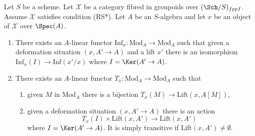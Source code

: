 \begin{lemma}
\label{lemma-properties-lift-RS-star}
Let $S$ be a scheme. Let $\mathcal{X}$ be a category
fibred in groupoids over $(\Sch/S)_{fppf}$. Assume $\mathcal{X}$ satisfies
condition (RS*). Let $A$ be an $S$-algebra and let $x$ be an object of
$\mathcal{X}$ over $\Spec(A)$.
\begin{enumerate}
\item There exists an $A$-linear functor
$\text{Inf}_x : \text{Mod}_A \to \text{Mod}_A$
such that given a deformation situation $(x, A' \to A)$ and a lift $x'$
there is an isomorphism $\text{Inf}_x(I) \to \text{Inf}(x'/x)$ where
$I = \Ker(A' \to A)$.
\item There exists an $A$-linear functor
$T_x : \text{Mod}_A \to \text{Mod}_A$
such that
\begin{enumerate}
\item given $M$ in $\text{Mod}_A$ there is a bijection
$T_x(M) \to \text{Lift}(x, A[M])$,
\item given a deformation situation $(x, A' \to A)$ there is an action
$$
T_x(I) \times \text{Lift}(x, A') \to \text{Lift}(x, A')
$$
where $I = \Ker(A' \to A)$. It is simply transitive if
$\text{Lift}(x, A') \not = \emptyset$.
\end{enumerate}
\end{enumerate}
\end{lemma}

